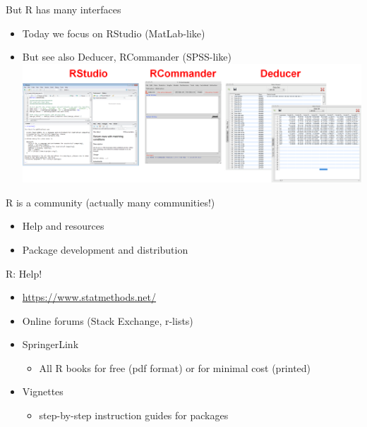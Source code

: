 \documentclass[
  ignorenonframetext,
]{beamer}
\providecommand{\tightlist}{%
  \setlength{\itemsep}{0pt}\setlength{\parskip}{0pt}}
\begin{document}
\begin{frame}{But R has many interfaces}
\protect\hypertarget{but-r-has-many-interfaces}{}

\begin{itemize}
\tightlist
\item
  Today we focus on RStudio (MatLab-like)
\item
  But see also Deducer, RCommander (SPSS-like)
  \includegraphics{../external/images/intro_rgui_2.PNG}
\end{itemize}

\end{frame}

\begin{frame}{R is a community (actually many communities!)}
\protect\hypertarget{r-is-a-community-actually-many-communities}{}

\begin{itemize}
\tightlist
\item
  Help and resources
\item
  Package development and distribution
\end{itemize}

\end{frame}

\begin{frame}{R: Help!}
\protect\hypertarget{r-help}{}

\begin{itemize}
\tightlist
\item
  \url{https://www.statmethods.net/}
\item
  Online forums (Stack Exchange, r-lists)
\item
  SpringerLink

  \begin{itemize}
  \tightlist
  \item
    All R books for free (pdf format) or for minimal cost (printed)
  \end{itemize}
\item
  Vignettes

  \begin{itemize}
  \tightlist
  \item
    step-by-step instruction guides for packages
  \end{itemize}
\end{itemize}

\end{frame}
\end{document}
